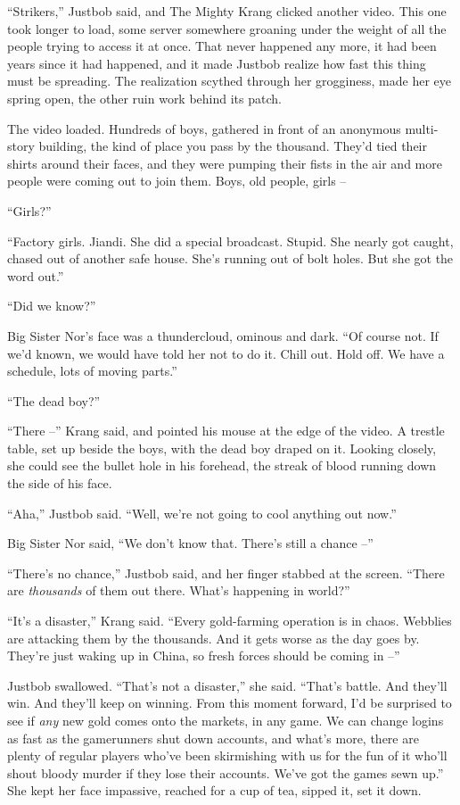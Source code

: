 ``Strikers,'' Justbob said, and The Mighty Krang clicked another
video. This one took longer to load, some server somewhere groaning
under the weight of all the people trying to access it at once.
That never happened any more, it had been years since it had
happened, and it made Justbob realize how fast this thing must be
spreading. The realization scythed through her grogginess, made her
eye spring open, the other ruin work behind its patch.

The video loaded. Hundreds of boys, gathered in front of an
anonymous multi-story building, the kind of place you pass by the
thousand. They'd tied their shirts around their faces, and they
were pumping their fists in the air and more people were coming out
to join them. Boys, old people, girls --

``Girls?''

``Factory girls. Jiandi. She did a special broadcast. Stupid. She
nearly got caught, chased out of another safe house. She's running
out of bolt holes. But she got the word out.''

``Did we know?''

Big Sister Nor's face was a thundercloud, ominous and dark. ``Of
course not. If we'd known, we would have told her not to do it.
Chill out. Hold off. We have a schedule, lots of moving parts.''

``The dead boy?''

``There --'' Krang said, and pointed his mouse at the edge of the
video. A trestle table, set up beside the boys, with the dead boy
draped on it. Looking closely, she could see the bullet hole in his
forehead, the streak of blood running down the side of his face.

``Aha,'' Justbob said. ``Well, we're not going to cool anything out
now.''

Big Sister Nor said, ``We don't know that. There's still a chance
--''

``There's no chance,'' Justbob said, and her finger stabbed at the
screen. ``There are \emph{thousands} of them out there. What's
happening in world?''

``It's a disaster,'' Krang said. ``Every gold-farming operation is in
chaos. Webblies are attacking them by the thousands. And it gets
worse as the day goes by. They're just waking up in China, so fresh
forces should be coming in --''

Justbob swallowed. ``That's not a disaster,'' she said. ``That's
battle. And they'll win. And they'll keep on winning. From this
moment forward, I'd be surprised to see if \emph{any} new gold
comes onto the markets, in any game. We can change logins as fast
as the gamerunners shut down accounts, and what's more, there are
plenty of regular players who've been skirmishing with us for the
fun of it who'll shout bloody murder if they lose their accounts.
We've got the games sewn up.'' She kept her face impassive, reached
for a cup of tea, sipped it, set it down.

